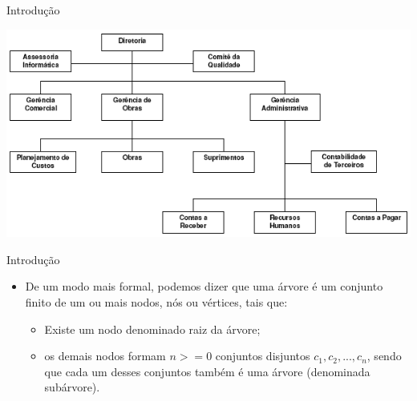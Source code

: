 \documentclass[12pt,table,xcolor={dvipsnames}]{beamer}
\begin{document}
\begin{frame}[fragile]{Introdução}
          \begin{center}
          \includegraphics[scale=.5]{empresa.png} 
          \end{center}
\end{frame}

\begin{frame}[fragile]{Introdução}
\begin{itemize}
\item De um modo mais formal, podemos dizer que uma árvore é um conjunto finito de um ou mais nodos, nós ou vértices, tais que:
\begin{itemize}
\item  Existe um nodo denominado raiz da árvore;
\item  os demais nodos formam $n >= 0$ conjuntos disjuntos $c_1, c_2, ..., c_n$, sendo que cada um desses conjuntos também é uma árvore (denominada subárvore).
\end{itemize}
\end{itemize}
\end{frame}
\end{document}
